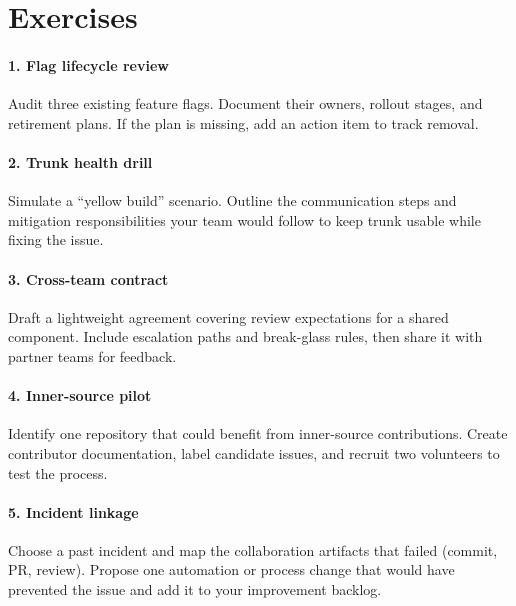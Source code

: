 \section*{Exercises}

\paragraph{1. Flag lifecycle review} Audit three existing feature flags. Document their owners, rollout stages, and retirement plans. If the plan is missing, add an action item to track removal.

\paragraph{2. Trunk health drill} Simulate a ``yellow build'' scenario. Outline the communication steps and mitigation responsibilities your team would follow to keep trunk usable while fixing the issue.

\paragraph{3. Cross-team contract} Draft a lightweight agreement covering review expectations for a shared component. Include escalation paths and break-glass rules, then share it with partner teams for feedback.

\paragraph{4. Inner-source pilot} Identify one repository that could benefit from inner-source contributions. Create contributor documentation, label candidate issues, and recruit two volunteers to test the process.

\paragraph{5. Incident linkage} Choose a past incident and map the collaboration artifacts that failed (commit, PR, review). Propose one automation or process change that would have prevented the issue and add it to your improvement backlog.
